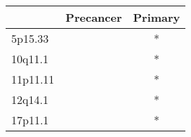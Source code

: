 \begin{tabular}{lcc}
\toprule
{} & Precancer & Primary \\
\midrule
5p15.33  &           &       * \\
10q11.1  &           &       * \\
11p11.11 &           &       * \\
12q14.1  &           &       * \\
17p11.1  &           &       * \\
\bottomrule
\end{tabular}
